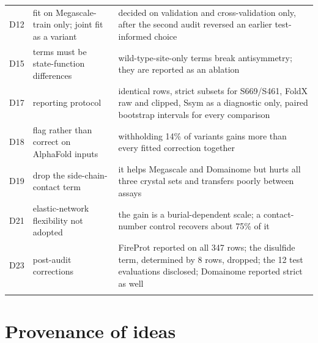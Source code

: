 \documentclass[unnumsec,webpdf,contemporary,large]{oup-authoring-template}
\begin{document}
\begin{table}[t]
\begin{tabular*}{\textwidth}{@{\extracolsep\fill}lp{}p{}@{}}
D12 & fit on Megascale-train only; joint fit as a variant & decided on validation and cross-validation only, after the second audit reversed an earlier test-informed choice \\
D15 & terms must be state-function differences & wild-type-site-only terms break antisymmetry; they are reported as an ablation \\
D17 & reporting protocol & identical rows, strict subsets for S669/S461, FoldX raw and clipped, Ssym as a diagnostic only, paired bootstrap intervals for every comparison \\
D18 & flag rather than correct on AlphaFold inputs & withholding 14\% of variants gains more than every fitted correction together \\
D19 & drop the side-chain-contact term & it helps Megascale and Domainome but hurts all three crystal sets and transfers poorly between assays \\
D21 & elastic-network flexibility not adopted & the gain is a burial-dependent scale; a contact-number control recovers about 75\% of it \\
D23 & post-audit corrections & FireProt reported on all 347 rows; the disulfide term, determined by 8 rows, dropped; the 12 test evaluations disclosed; Domainome reported strict as well \\
\botrule
\end{tabular*}
\end{table}

\section{Provenance of ideas}
\end{document}
